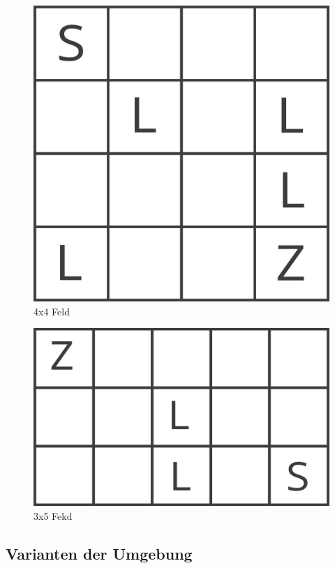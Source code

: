 \begin{figure}[H]
\centering
\includegraphics[width=\textwidth]{Figures/advanced1.png}
\caption{4x4 Feld}
\label{advanced1}
\end{figure}

\begin{figure}[H]
\centering
\includegraphics[width=\textwidth]{Figures/advanced2.png}
\caption{3x5 Fekd}
\label{advanced2}
\end{figure}

\subsection{Varianten der Umgebung}
\label{subsec:vars}

